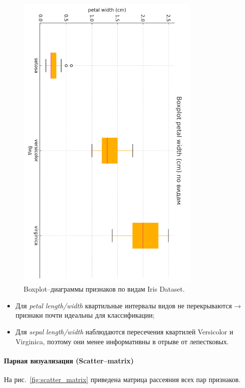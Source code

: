 \begin{figure}[H]
  \includegraphics[width=0.8\textwidth]{images/box_petal_width_cm_cb2.png}
  \caption{Boxplot–диаграммы признаков по видам Iris Dataset.}
\end{figure}
\begin{itemize}
  \item Для \emph{petal length/width} квартильные интервалы видов не перекрываются → признаки почти идеальны для классификации;
  \item Для \emph{sepal length/width} наблюдаются пересечения квартилей Versicolor и Virginica, поэтому они менее информативны в отрыве от лепестковых.
\end{itemize}

\paragraph{Парная визуализация (Scatter–matrix)}

На рис.~\ref{fig:scatter_matrix} приведена матрица рассеяния всех пар признаков.

